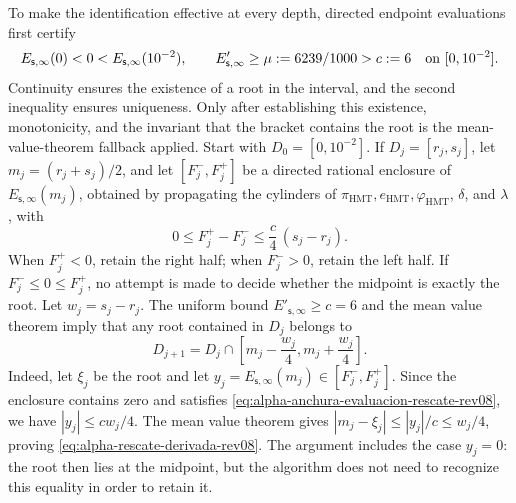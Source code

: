 To make the identification effective at every depth, directed endpoint
evaluations first certify
\[
 E_{\mathsf s,\infty}(0)<0<
 E_{\mathsf s,\infty}(10^{-2}),
 \qquad
 E'_{\mathsf s,\infty}\geq\mu:=6239/1000>c:=6
 \quad\hbox{on }[0,10^{-2}].
\]
Continuity ensures the existence of a root in the interval, and the second inequality
ensures uniqueness. Only after establishing this existence, monotonicity, and the
invariant that the bracket contains the root is the mean-value-theorem
fallback applied. Start with \(D_0=[0,10^{-2}]\). If
\(D_j=[r_j,s_j]\), let \(m_j=(r_j+s_j)/2\), and let
\([F_j^-,F_j^+]\) be a directed rational enclosure of
\(E_{\mathsf s,\infty}(m_j)\), obtained by propagating the cylinders of
\(\pi_{\mathrm{HMT}},e_{\mathrm{HMT}},\varphi_{\mathrm{HMT}}\),
\(\delta\), and \(\lambda\), with
\begin{equation}
 0\leq F_j^+-F_j^-\leq \frac{c}{4}\,(s_j-r_j).
 \label{eq:alpha-anchura-evaluacion-rescate-rev08}
\end{equation}
When \(F_j^+<0\), retain the right half;
when \(F_j^->0\), retain the left half. If
\(F_j^-\leq0\leq F_j^+\), no attempt is made to decide whether the midpoint
is exactly the root. Let \(w_j=s_j-r_j\). The uniform bound
\(E'_{\mathsf s,\infty}\geq c=6\) and the mean value theorem imply that
any root contained in \(D_j\) belongs to
\begin{equation}
 D_{j+1}=D_j\cap
 \left[m_j-\frac{w_j}{4},
             m_j+\frac{w_j}{4}\right].
 \label{eq:alpha-rescate-derivada-rev08}
\end{equation}
Indeed, let \(\xi_j\) be the root and let
\(y_j=E_{\mathsf s,\infty}(m_j)\in[F_j^-,F_j^+]\). Since the enclosure contains
zero and satisfies \eqref{eq:alpha-anchura-evaluacion-rescate-rev08}, we have
\(|y_j|\leq cw_j/4\). The mean value theorem gives
\(|m_j-\xi_j|\leq |y_j|/c\leq w_j/4\), proving
\eqref{eq:alpha-rescate-derivada-rev08}. The argument includes the case
\(y_j=0\): the root then lies at the midpoint, but the algorithm does not
need to recognize this equality in order to retain it.

